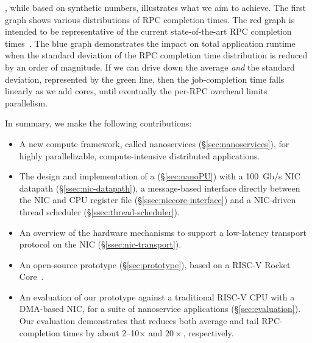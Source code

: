 , while based on synthetic numbers, illustrates what we aim to achieve.
The first graph shows various distributions of RPC completion times. 
The red graph is intended to be representative of the current state-of-the-art RPC completion times~\cite{eRPC}. The blue graph demonstrates the impact on total application runtime when the standard deviation of the RPC completion time distribution is reduced by an order of magnitude.
If we can drive down the average {\em and} the standard deviation, represented by the green line, then the job-completion time falls linearly as we add cores, until eventually the per-RPC overhead limits parallelism.

In summary, we make the following contributions:
\begin{itemize}[topsep=0.4\baselineskip, leftmargin=20pt]
    \item A new compute framework, called nanoservices (\S\ref{sec:nanoservices}), for highly parallelizable, compute-intensive distributed applications.
    \item The design and implementation of a \name{} (\S\ref{sec:nanoPU}) with a \SI{100}{Gb/s} NIC datapath (\S\ref{ssec:nic-datapath}), a message-based interface directly between the NIC and CPU register file (\S\ref{ssec:niccore-interface}) and a NIC-driven thread scheduler (\S\ref{ssec:thread-scheduler}).
    \item An overview of the hardware mechanisms to support a low-latency transport protocol on the NIC (\S\ref{ssec:nic-transport}).
    \item An open-source \name{} prototype (\S\ref{sec:prototype}), based on a RISC-V Rocket Core~\cite{rocket-chip}.
    \item An evaluation of our \name{} prototype against a traditional RISC-V CPU with a DMA-based NIC, for a suite of nanoservice applications (\S\ref{sec:evaluation}). 
    Our evaluation demonstrates that \name{} reduces both average and tail RPC-completion times by about 2--10$\times$ and $20\times$, respectively.
\end{itemize}



